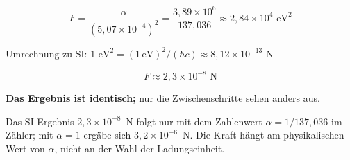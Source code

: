 	\begin{equation}
		F = \frac{\alpha}{(5{,}07 \times 10^{-4})^2} = \frac{3{,}89 \times 10^{6}}{137{,}036} \approx 2{,}84 \times 10^{4} \text{ eV}^2
	\end{equation}
	
	Umrechnung zu SI: $1 \text{ eV}^2 = (1\,\text{eV})^2/(\hbar c) \approx 8{,}12 \times 10^{-13}$ N
	
	\begin{equation}
		F \approx 2{,}3 \times 10^{-8} \text{ N}
	\end{equation}
	
	\textbf{Das Ergebnis ist identisch;} nur die Zwischenschritte sehen anders aus.
	
	Das SI-Ergebnis $2{,}3\times10^{-8}$~N folgt nur mit dem Zahlenwert $\alpha = 1/137{,}036$ im Zähler; mit $\alpha = 1$ ergäbe sich $3{,}2\times10^{-6}$~N. Die Kraft hängt am physikalischen Wert von $\alpha$, nicht an der Wahl der Ladungseinheit.
	